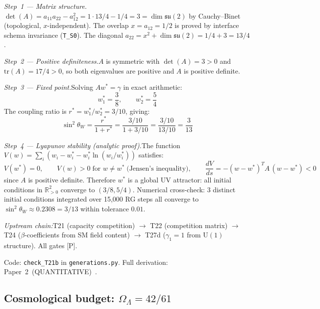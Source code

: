 \documentclass[11pt]{article}
\newcommand{\sw}{\sin^2\!\theta_W}
\newcommand{\tr}{\mathrm{tr}}
\newcommand{\U}{\mathrm{U}}
\begin{document}
\textit{Step~1 --- Matrix structure.}\quad $\det(A) = a_{11}a_{22} - a_{12}^2 = 1 \cdot 13/4 - 1/4 = 3 = \dim\mathfrak{su}(2)$ by Cauchy--Binet (topological, $x$-independent).  The overlap $x = a_{12} = 1/2$ is proved by interface schema invariance (\texttt{T\_S0}).  The diagonal $a_{22} = x^2 + \dim\mathfrak{su}(2) = 1/4 + 3 = 13/4$.

\textit{Step~2 --- Positive definiteness.}\quad $A$ is symmetric with $\det(A) = 3 > 0$ and $\tr(A) = 17/4 > 0$, so both eigenvalues are positive and $A$ is positive definite.

\textit{Step~3 --- Fixed point.}\quad Solving $Aw^* = \gamma$ in exact arithmetic:
\begin{equation}
w_1^* = \frac{3}{8}, \qquad w_2^* = \frac{5}{4}
\end{equation}
The coupling ratio is $r^* = w_1^*/w_2^* = 3/10$, giving:
\begin{equation}
\sw = \frac{r^*}{1 + r^*} = \frac{3/10}{1 + 3/10} = \frac{3/10}{13/10} = \frac{3}{13}
\end{equation}

\textit{Step~4 --- Lyapunov stability (analytic proof).}\quad The function $V(w) = \sum_i (w_i - w_i^* - w_i^* \ln(w_i/w_i^*))$ satisfies:
\begin{equation}
V(w^*) = 0, \qquad V(w) > 0 \;\text{for } w \ne w^* \;\text{(Jensen's inequality)}, \qquad \frac{dV}{ds} = -(w - w^*)^T A\,(w - w^*) < 0
\end{equation}
since $A$ is positive definite.  Therefore $w^*$ is a global UV attractor: all initial conditions in $\mathbb{R}^2_{>0}$ converge to $(3/8, 5/4)$.  Numerical cross-check: 3 distinct initial conditions integrated over 15,000 RG steps all converge to $\sw \approx 0.2308 = 3/13$ within tolerance $0.01$.

\textit{Upstream chain:}\quad T21 (capacity competition) $\to$ T22 (competition matrix) $\to$ T24 ($\beta$-coefficients from SM field content) $\to$ T27d ($\gamma_1 = 1$ from $\U(1)$ structure).  All gates [P].

Code: \texttt{check\_T21b} in \texttt{generations.py}.  Full derivation: Paper~2~(QUANTITATIVE)~\cite{P2Q}.


\subsection{Cosmological budget: \texorpdfstring{$\Omega_\Lambda = 42/61$}{ΩΛ = 42/61}}
\end{document}
